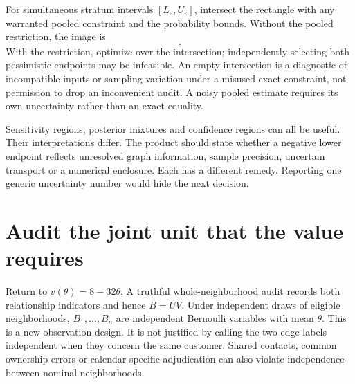 For simultaneous stratum intervals $[L_z,U_z]$, intersect the rectangle with
any warranted pooled constraint and the probability bounds. Without the
pooled restriction, the image is
\begin{equation}
 [22-8U_0-48U_1,\;22-8L_0-48L_1].
 \label{exec17:s7-rectangle}
\end{equation}
With the restriction, optimize over the intersection; independently selecting
both pessimistic endpoints may be infeasible. An empty intersection is a
diagnostic of incompatible inputs or sampling variation under a misused exact
constraint, not permission to drop an inconvenient audit. A noisy pooled
estimate requires its own uncertainty rather than an exact equality.

Sensitivity regions, posterior mixtures and confidence regions can all be
useful. Their interpretations differ. The product should state whether a
negative lower endpoint reflects unresolved graph information, sample
precision, uncertain transport or a numerical enclosure. Each has a different
remedy. Reporting one generic uncertainty number would hide the next decision.

\section{Audit the joint unit that the value requires}
\label{exec17:s7-audit}

Return to $v(\theta)=8-32\theta$. A truthful whole-neighborhood audit records
both relationship indicators and hence $B=UV$. Under independent draws of
eligible neighborhoods, $B_1,\ldots,B_n$ are independent Bernoulli variables
with mean $\theta$. This is a new observation design. It is not justified by
calling the two edge labels independent when they concern the same customer.
Shared contacts, common ownership errors or calendar-specific adjudication
can also violate independence between nominal neighborhoods.

